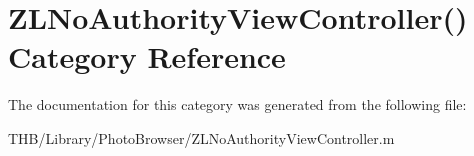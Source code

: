 \hypertarget{category_z_l_no_authority_view_controller_07_08}{}\section{Z\+L\+No\+Authority\+View\+Controller() Category Reference}
\label{category_z_l_no_authority_view_controller_07_08}


The documentation for this category was generated from the following file\+:\begin{DoxyCompactItemize}
\item 
T\+H\+B/\+Library/\+Photo\+Browser/Z\+L\+No\+Authority\+View\+Controller.\+m\end{DoxyCompactItemize}
